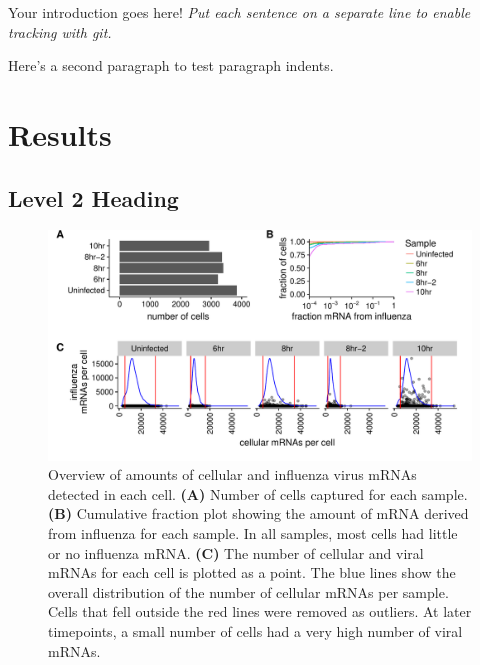\documentclass[9pt,lineno]{elife}
\begin{document}
Your introduction goes here!
\emph{Put each sentence on a separate line to enable tracking with git.}

Here's a second paragraph to test paragraph indents. \lipsum[1]

\section{Results}

\subsection{Level 2 Heading}

\lipsum[3]

\begin{figure}
\includegraphics[width=\linewidth]{figures/p_cell_mRNA_summary.pdf}
\caption{
Overview of amounts of cellular and influenza virus mRNAs detected in each cell.
{\bf (A)} 
Number of cells captured for each sample.
{\bf (B)} 
Cumulative fraction plot showing the amount of mRNA derived from influenza for each sample.
In all samples, most cells had little or no influenza mRNA.
{\bf (C)} 
The number of cellular and viral mRNAs for each cell is plotted as a point.
The blue lines show the overall distribution of the number of cellular mRNAs per sample.
Cells that fell outside the red lines were removed as outliers.
At later timepoints, a small number of cells had a very high number of viral mRNAs.
}
\label{fig:cells}

\end{figure}
\end{document}

